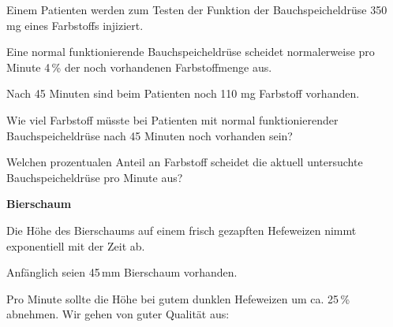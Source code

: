 Einem Patienten werden zum Testen der Funktion der Bauchspeicheldrüse
350 mg eines Farbstoffs injiziert.

Eine normal funktionierende Bauchspeicheldrüse scheidet normalerweise
pro Minute 4\,\% der noch vorhandenen Farbstoffmenge aus.

Nach 45 Minuten sind beim Patienten noch 110 mg Farbstoff vorhanden.

\begin{bbwAufgabenBlock}
\item Wie viel Farbstoff müsste bei Patienten mit normal funktionierender
  Bauchspeicheldrüse nach 45 Minuten noch vorhanden sein?


\item Welchen prozentualen Anteil an Farbstoff scheidet die aktuell
  untersuchte Bauchspeicheldrüse pro Minute aus?

\end{bbwAufgabenBlock}

\platzFuerBerechnungenBisEndeSeite{}
\bbwActAufgabenNr{} \textbf{Bierschaum}

Die Höhe des Bierschaums auf einem frisch gezapften Hefeweizen
nimmt exponentiell mit der Zeit ab.

Anfänglich seien 45\,mm Bierschaum vorhanden.

Pro Minute sollte die Höhe bei gutem dunklen Hefeweizen um ca. 25\,\%
abnehmen. Wir gehen von guter Qualität aus:

